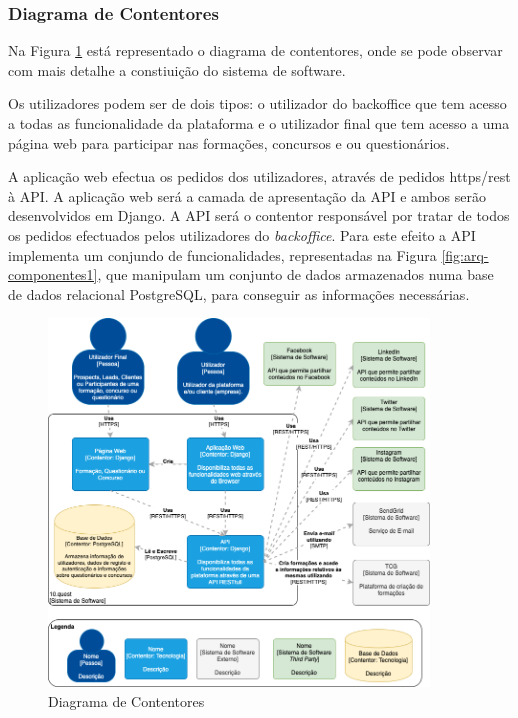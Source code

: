 \subsubsection{Diagrama de Contentores}

Na Figura \ref{fig:arq-contentores} está representado o diagrama de contentores, onde se pode observar com mais detalhe a constiuição do sistema de software.

Os utilizadores podem ser de dois tipos: o utilizador do backoffice que tem acesso a todas as funcionalidade da plataforma e o utilizador final que tem acesso a uma página web para participar nas formações, concursos e ou questionários.

A aplicação web efectua os pedidos dos utilizadores, através de pedidos \acrshort{https}/\acrshort{rest} à API. A aplicação web será a camada de apresentação da API e ambos serão desenvolvidos em Django. A API será o contentor responsável por tratar de todos os pedidos efectuados pelos utilizadores do \textit{backoffice}. Para este efeito a API implementa um conjundo de funcionalidades, representadas na Figura \ref{fig:arq-componentes1}, que manipulam um conjunto de dados armazenados numa base de dados relacional PostgreSQL, para conseguir as informações necessárias.
\newpage

\begin{figure}[ht!]
	\begin{center}
		\includegraphics[width=0.9\textwidth]{img/arq/diagrama-contentores}
		\caption{Diagrama de Contentores}
		\label{fig:arq-contentores}
	\end{center}
\end{figure}

